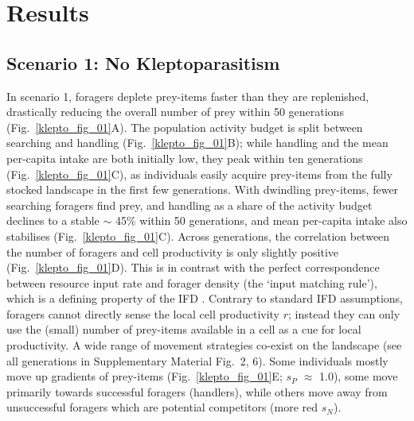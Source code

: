 \section*{Results}

\subsection*{Scenario 1: No Kleptoparasitism}

In scenario 1, foragers deplete prey-items faster than they are replenished, drastically reducing the overall number of prey within 50 generations (Fig.~\ref{klepto_fig_01}A).
The population activity budget is split between searching and handling (Fig.~\ref{klepto_fig_01}B); while handling and the mean per-capita intake are both initially low, they peak within ten generations (Fig.~\ref{klepto_fig_01}C), as individuals easily acquire prey-items from the fully stocked landscape in the first few generations.
With dwindling prey-items, fewer searching foragers find prey, and handling as a share of the activity budget declines to a stable $\sim$ 45\% within 50 generations, and mean per-capita intake also stabilises (Fig.~\ref{klepto_fig_01}C).
Across generations, the correlation between the number of foragers and cell productivity is only slightly positive (Fig.~\ref{klepto_fig_01}D).
This is in contrast with the perfect correspondence between resource input rate and forager density (the `input matching rule'), which is a defining property of the IFD \citep{parker1978, houston2008}.
Contrary to standard IFD assumptions, foragers cannot directly sense the local cell productivity $r$; instead they can only use the (small) number of prey-items available in a cell as a cue for local productivity.
A wide range of movement strategies co-exist on the landscape (see all generations in Supplementary Material Fig.~2, 6).
Some individuals mostly move up gradients of prey-items (Fig.~\ref{klepto_fig_01}E; $s_P$ $\approx$ 1.0), some move primarily towards successful foragers (handlers), while others move away from unsuccessful foragers which are potential competitors (more red $s_N$).

